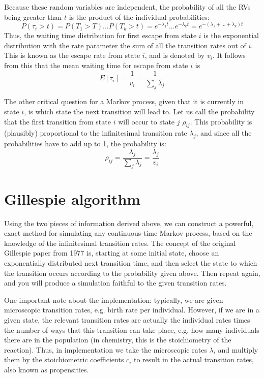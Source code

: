 \documentclass[11pt]{book}
\begin{document}
Because these random variables are independent, the probability of all the RVs being greater than $t$ is the product of the individual probabilities:
$$ P(\tau_i > t) = P(T_1 > T) ... P(T_k > t) = e^{-\lambda_1 t} ... e^{-\lambda_k t} = e^{- (\lambda_1+ ... + \lambda_k)t} $$ 
Thus, the waiting time distribution for first escape from state $i$ is the exponential distribution with the rate parameter the sum of all the transition rates out of $i$. This is known as the escape rate from state $i$, and is denoted by $v_i$. It follows from this that the mean waiting time for escape from state $i$ is
$$ E[\tau_ i] = \frac{1}{v_{i}} = \frac{1}{\sum_j\lambda_{j}} $$

The other critical question for a Markov process, given that it is currently in state $i$, is which state the next transition will lead to. Let us call the probability that the first transition from state $i$ will occur to state $j$ $\rho_{ij}$. This probability is (plausibly) proportional to the infinitesimal transition rate $\lambda_j$, and since all the probabilities have to add up to 1, the probability is:
$$ \rho_{ij}   = \frac{\lambda_j}{\sum_j \lambda_j} =  \frac{\lambda_j}{v_i} $$

\section{Gillespie algorithm}
Using the two pieces of information derived above, we can construct a powerful, exact method for simulating any continuous-time Markov process, based on the knowledge of the infinitesimal transition rates. The concept of the original Gillespie paper from 1977 is, starting at some initial state, choose an exponentially distributed next transition time, and then select the state to which the transition occurs according to the probability given above. Then repeat again, and you will produce a simulation faithful to the given transition rates.

One important note about the implementation: typically, we are given microscopic transition rates, e.g. birth rate per individual. However, if we are in a given state, the relevant transition rates are actually the individual rates times the number of ways that this transition can take place, e.g. how many individuals there are in the population (in chemistry, this is the stoichiometry of the reaction). Thus, in implementation we take the microscopic rates $\lambda_i$ and multiply them by the stoichiometric coefficients $c_i$ to result in the actual transition rates, also known as propensities.
\end{document}
